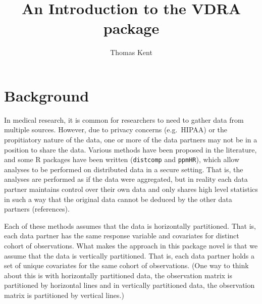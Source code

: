 \documentclass[12]{article}
\title{An Introduction to the VDRA package}
\author{Thomas Kent}
\begin{document}
\maketitle


%
%	

\section{Background}

In medical research, it is common for researchers to need to gather data from multiple sources.  However, due to privacy concerns (e.g.\ HIPAA) or the propitiatory nature of the data, one or more of the data partners may not be in a position to share the data.  Various methods have been proposed in the literature, and some R packages have been written (\verb"distcomp" and \verb"ppmHR"), which allow analyses to be performed on distributed data in a secure setting.  That is, the analyses are performed as if the data were aggregated, but in reality each data partner maintains control over their own data and only shares high level statistics in such a way that the original data cannot be deduced by the other data partners (references).  

Each of these methods assumes that the data is horizontally partitioned.  That is, each data partner has the same response variable and covariates for distinct cohort of observations.  What makes the approach in this package novel is that we assume that the data is vertically partitioned.  That is, each data partner holds a set of unique covariates for the same cohort of observations.  (One way to think about this is with horizontally partitioned data, the observation matrix is partitioned by horizontal lines and in vertically partitioned data, the observation matrix is partitioned by vertical lines.)
\end{document}
